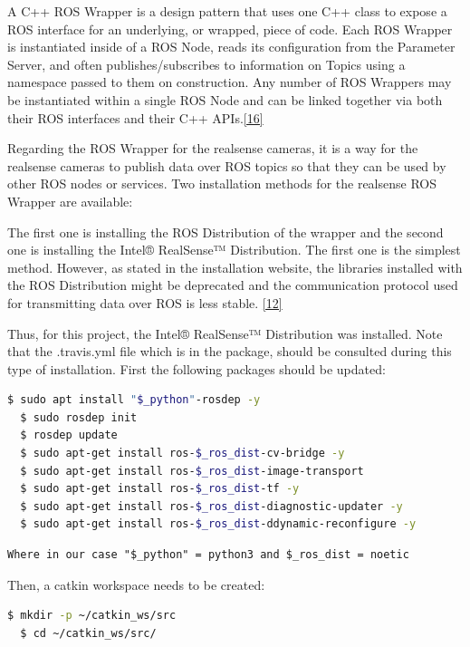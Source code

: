 \documentclass{article}
\begin{document}
A C++ ROS Wrapper is a design pattern that uses one C++ class to expose a ROS interface for an underlying, or wrapped, piece of code. Each ROS Wrapper is instantiated inside of a ROS Node, reads its configuration from the Parameter Server, and often publishes/subscribes to information on Topics using a namespace passed to them on construction. Any number of ROS Wrappers may be instantiated within a single ROS Node and can be linked together via both their ROS interfaces and their C++ APIs.\href{http://wiki.ros.org/navigation/ROS_Wrappers}{[16]}

Regarding the ROS Wrapper for the realsense cameras, it is a way for the realsense cameras to publish data over ROS topics so that they can be used by other ROS nodes or services.
Two installation methods for the realsense ROS Wrapper are available:

The first one is installing the ROS Distribution of the wrapper and the second one is installing the Intel® RealSense™ Distribution. The first one is the simplest method. However, as stated in the installation website, the libraries installed with the ROS Distribution might be deprecated and the communication protocol used for transmitting data over ROS is less stable. \href{https://github.com/IntelRealSense/realsense-ros}{[12]}

Thus, for this project, the  Intel® RealSense™ Distribution was installed. Note that the .travis.yml file which is in the package, should be consulted during this type of installation. First the following packages should be updated:

\begin{lstlisting}[language=bash]
  $ sudo apt install "$_python"-rosdep -y
  $ sudo rosdep init
  $ rosdep update
  $ sudo apt-get install ros-$_ros_dist-cv-bridge -y
  $ sudo apt-get install ros-$_ros_dist-image-transport
  $ sudo apt-get install ros-$_ros_dist-tf -y
  $ sudo apt-get install ros-$_ros_dist-diagnostic-updater -y
  $ sudo apt-get install ros-$_ros_dist-ddynamic-reconfigure -y

\end{lstlisting}

\begin{verbatim}
Where in our case "$_python" = python3 and $_ros_dist = noetic
\end{verbatim}

Then, a catkin workspace needs to be created:

\begin{lstlisting}[language=bash]
  $ mkdir -p ~/catkin_ws/src
  $ cd ~/catkin_ws/src/
\end{lstlisting}
\end{document}
